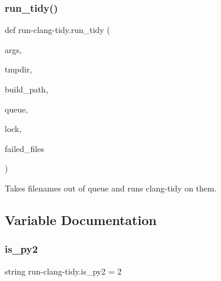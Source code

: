 \subsubsection{\texorpdfstring{run\+\_\+tidy()}{run\_tidy()}}
{\footnotesize\ttfamily def run-\/clang-\/tidy.\+run\+\_\+tidy (\begin{DoxyParamCaption}\item[{}]{args,  }\item[{}]{tmpdir,  }\item[{}]{build\+\_\+path,  }\item[{}]{queue,  }\item[{}]{lock,  }\item[{}]{failed\+\_\+files }\end{DoxyParamCaption})}

\begin{DoxyVerb}Takes filenames out of queue and runs clang-tidy on them.\end{DoxyVerb}
 

\subsection{Variable Documentation}
\mbox{\label{namespacerun-clang-tidy_aa041a8caae6885ce927c63a08f77dd83}} 
\subsubsection{\texorpdfstring{is\+\_\+py2}{is\_py2}}
{\footnotesize\ttfamily string run-\/clang-\/tidy.\+is\+\_\+py2 = \textquotesingle{}2\textquotesingle{}}


